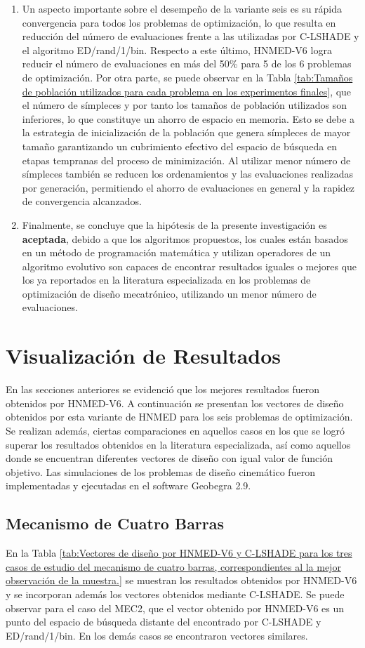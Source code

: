 \begin{enumerate}
  \item Un aspecto importante sobre el desempeño de la variante seis es su rápida convergencia para todos los problemas de optimización, lo que resulta en reducción del número de evaluaciones frente a las utilizadas por C-LSHADE y el algoritmo ED/rand/1/bin. Respecto a este último, HNMED-V6 logra reducir el número de evaluaciones en más del 50\% para 5 de los 6 problemas de optimización. Por otra parte, se puede observar en la Tabla \ref{tab:Tamaños de población utilizados para cada problema en los experimentos finales}, que el número de símpleces y por tanto los tamaños de población utilizados son inferiores, lo que constituye un ahorro de espacio en memoria. Esto se debe a la estrategia de inicialización de la población que genera símpleces de mayor tamaño  garantizando un cubrimiento efectivo del espacio de búsqueda en etapas tempranas del proceso de minimización. Al utilizar menor número de símpleces también se reducen los ordenamientos y las evaluaciones realizadas por generación, permitiendo el ahorro de evaluaciones en general y la rapidez de convergencia alcanzados.

\item Finalmente, se concluye que la hipótesis de la presente investigación es \textbf{aceptada}, debido a que los algoritmos propuestos, los cuales están basados en un método de programación matemática y utilizan operadores de un algoritmo evolutivo son capaces de encontrar resultados iguales o mejores que los ya reportados en la literatura especializada en los problemas de optimización de diseño mecatrónico, utilizando un menor número de evaluaciones.
\end{enumerate}

\section{Visualización de Resultados}
En las secciones anteriores se evidenció que los mejores resultados fueron obtenidos por HNMED-V6. A continuación se presentan los vectores de diseño obtenidos por esta variante de HNMED para los seis problemas de optimización. Se realizan además, ciertas comparaciones en aquellos casos en los que se logró superar los resultados obtenidos en la literatura especializada, así como aquellos donde se encuentran diferentes vectores de diseño con igual valor de función objetivo. Las simulaciones de los problemas de diseño cinemático fueron implementadas y ejecutadas en el software Geobegra 2.9.
\subsection{Mecanismo de Cuatro Barras}
En la Tabla \ref{tab:Vectores de diseño por HNMED-V6 y C-LSHADE para los tres casos de estudio del mecanismo de cuatro barras, correspondientes al la mejor observación de la muestra.} se muestran los resultados obtenidos por HNMED-V6 y se incorporan además los vectores obtenidos mediante C-LSHADE. Se puede observar para el caso del MEC2, que el vector obtenido por HNMED-V6 es un punto del espacio de búsqueda distante del encontrado por C-LSHADE y ED/rand/1/bin. En los demás casos se encontraron vectores similares.  

